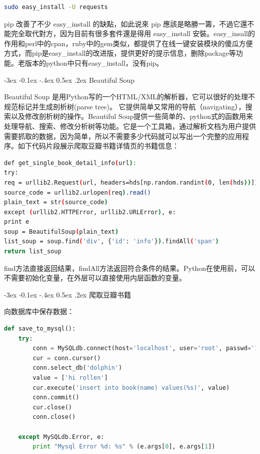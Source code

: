 \documentclass[12pt]{book}
\makeatletter
\numberwithin{dummy}{section}
\theoremstyle{ocrenumbox}
\theoremstyle{blacknumex}
\theoremstyle{blacknumbox}
\theoremstyle{ocrenum}
\renewcommand{\subsection}{\@startsection {subsection}{2}{\z@}
	{-3ex \@plus -0.1ex \@minus -.4ex}
	{0.5ex \@plus.2ex }
	{\normalfont\sffamily\bfseries}}
\makeatother
\begin{document}
\begin{lstlisting}[language=Bash]
sudo easy_install -U requests
\end{lstlisting}

pip 改善了不少 easy\_install 的缺點，如此说來 pip 應該是略勝一籌，不過它還不能完全取代對方，因为目前有很多套件還是得用 easy\_install 安裝。easy\_insall的作用和perl中的cpan，ruby中的gem类似，都提供了在线一键安装模块的傻瓜方便方式，而pip是easy\_install的改进版，提供更好的提示信息，删除package等功能。老版本的python中只有easy\_install，没有pip。

\subsection{Beautiful Soup}

Beautiful Soup 是用Python写的一个HTML/XML的解析器，它可以很好的处理不规范标记并生成剖析树(parse tree)。 它提供简单又常用的导航（navigating），搜索以及修改剖析树的操作。Beautiful Soup提供一些简单的、python式的函数用来处理导航、搜索、修改分析树等功能。它是一个工具箱，通过解析文档为用户提供需要抓取的数据，因为简单，所以不需要多少代码就可以写出一个完整的应用程序。如下代码片段展示爬取豆瓣书籍详情页的书籍信息：

\begin{lstlisting}[language=Bash]
def get_single_book_detail_info(url):
try:
req = urllib2.Request(url, headers=hds[np.random.randint(0, len(hds))])
source_code = urllib2.urlopen(req).read()
plain_text = str(source_code)
except (urllib2.HTTPError, urllib2.URLError), e:
print e
soup = BeautifulSoup(plain_text)
list_soup = soup.find('div', {'id': 'info'}).findAll('span')
return list_soup
\end{lstlisting}

find方法直接返回结果，findAll方法返回符合条件的结果。Python在使用前，可以不需要初始化变量，在外层可以直接使用内层函数的变量。

\subsection{爬取豆瓣书籍}

向数据库中保存数据：

\begin{lstlisting}[language=Python]
def save_to_mysql():
	try:
		conn = MySQLdb.connect(host='localhost', user='root', passwd='123456', port=3306)
		cur = conn.cursor()
		conn.select_db('dolphin')
		value = ['hi rollen']
		cur.execute('insert into book(name) values(%s)', value)
		conn.commit()
		cur.close()
		conn.close()
	
	except MySQLdb.Error, e:
		print "Mysql Error %d: %s" % (e.args[0], e.args[1])
\end{lstlisting}
\end{document}
